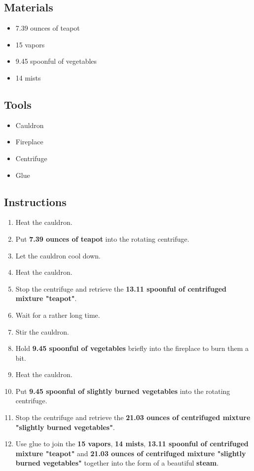 \documentclass{article}
\begin{document}
\subsection{Materials}\begin{itemize}
\item 
7.39 ounces of teapot
\item 
15 vapors
\item 
9.45 spoonful of vegetables
\item 
14 mists
\end{itemize}
\subsection{Tools}\begin{itemize}
\item 
Cauldron
\item 
Fireplace
\item 
Centrifuge
\item 
Glue
\end{itemize}
\subsection{Instructions}\begin{enumerate}
\item 
Heat the cauldron.
\item 
Put \textbf{7.39 ounces of teapot} into the rotating centrifuge.
\item 
Let the cauldron cool down.
\item 
Heat the cauldron.
\item 
Stop the centrifuge and retrieve the \textbf{13.11 spoonful of centrifuged mixture "teapot"}.
\item 
Wait for a rather long time.
\item 
Stir the cauldron.
\item 
Hold \textbf{9.45 spoonful of vegetables} briefly into the fireplace to burn them a bit.
\item 
Heat the cauldron.
\item 
Put \textbf{9.45 spoonful of slightly burned vegetables} into the rotating centrifuge.
\item 
Stop the centrifuge and retrieve the \textbf{21.03 ounces of centrifuged mixture "slightly burned vegetables"}.
\item 
Use glue to join the \textbf{15 vapors}, \textbf{14 mists}, \textbf{13.11 spoonful of centrifuged mixture "teapot"} and \textbf{21.03 ounces of centrifuged mixture "slightly burned vegetables"} together into the form of a beautiful \textbf{steam}.
\end{enumerate}
\newpage
\end{document}
